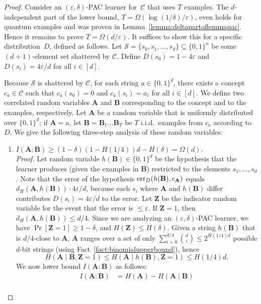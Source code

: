 \documentclass[twoside,11pt]{article}
\newcommand{\eps}{\varepsilon}
\newcommand{\err}{\mbox{\rm err}}
\newcommand{\Sh}{\ensuremath{\mathcal{S}}}
\def\01{\{0,1\}}
\newcommand{\C}{\ensuremath{\mathscr{C}}}
\begin{document}
\begin{proof}
	Consider an $(\eps,\delta)$-PAC learner for~$\C$ that uses $T$ examples.
	The $d$-independent part of the lower bound, $T=\Omega(\log(1/\delta)/\eps)$, even holds for quantum examples and was proven in Lemma~\ref{lemma:deltapartoflemmapac}.
	Hence it remains to prove $T=\Omega(d/\eps)$.
	It suffices to show this for a specific distribution~$D$, defined as follows. Let $\Sh=\{s_0,s_1,\ldots,s_d\} \subseteq \01^n$ be some $(d+1)$-element set shattered by $\C$. Define $D(s_0)=1-4\eps$ and $D(s_i)=4\eps/d$ for all $i\in [d]$. 
	
	Because $\Sh$ is shattered by $\C$, for each string $a\in\01^d$, there exists a concept $c_a\in\C$ such that $c_a(s_0)=0$ and $c_a(s_i)=a_i$ for all $i\in[d]$. We define two correlated random variables $\mathbf{A}$ and $\mathbf{B}$ corresponding to the concept and to the examples, respectively. Let $\mathbf{A}$ be a random variable that is uniformly distributed over $\01^d$; if $\mathbf{A}=a$, let $\mathbf{B}=\mathbf{B}_1\ldots\mathbf{B}_T$ be $T$ i.i.d.\ examples from $c_a$ according to $D$. We give the following three-step analysis of these random variables:
	\begin{enumerate}
		\item $I(\mathbf{A}:\mathbf{B})\geq (1-\delta)(1-H(1/4))d - H(\delta)=\Omega(d)$.\\[1mm]
		\emph{Proof.} Let random variable $h(\mathbf{B})\in\01^d$ be the hypothesis that the learner produces (given the examples in $\mathbf{B}$) restricted to the elements $s_1,\ldots,s_d$. Note that the error of the hypothesis $\err_D(h(\mathbf{B}),c_{\mathbf{A}})$ equals $ d_H(\mathbf{A},h(\mathbf{B}))\cdot 4\eps/d$, because each $s_i$ where $\mathbf{A}$ and $h(\mathbf{B})$ differ contributes $D(s_i)=4\eps/d$ to the error. Let $\mathbf{Z}$ be the indicator random variable for the event that the error is $\leq\eps$. If $\mathbf{Z}=1$, then $d_H(\mathbf{A},h(\mathbf{B}))\leq d/4$. Since we are analyzing an $(\eps,\delta)$-PAC learner, we have $\Pr[\mathbf{Z}=1]\geq 1-\delta$, and $H(\mathbf{Z})\leq H(\delta)$.  Given a string $h(\mathbf{B})$ that is $d/4$-close to $\mathbf{A}$, $\mathbf{A}$ ranges over a set of only $\sum_{i=0}^{d/4}{d\choose i}\leq 2^{H(1/4)d}$ possible $d$-bit strings (using Fact~\ref{fact:binomialupperbound}), hence $$H(\mathbf{A}\mid\mathbf{B},\mathbf{Z}=1)\leq H(\mathbf{A}\mid h(\mathbf{B}),\mathbf{Z}=1)\leq H(1/4)d.$$
		We now lower bound $I(\mathbf{A}:\mathbf{B})$ as follows:
		\begin{align*}
		I(\mathbf{A}:\mathbf{B}) & = H(\mathbf{A})-H(\mathbf{A}\mid\mathbf{B})\\

\end{align*}
\end{enumerate}
\end{proof}
\end{document}
